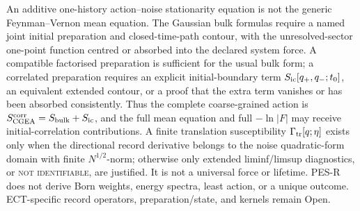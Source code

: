 \documentclass[11pt,a4paper]{article}
\begin{document}
An additive one-history action--noise stationarity equation is not the
generic Feynman--Vernon mean equation.  The Gaussian bulk formulas require a
named joint initial preparation and closed-time-path contour, with the
unresolved-sector one-point function centred or absorbed into the declared
system force.  A compatible factorised preparation is sufficient for the
usual bulk form; a correlated preparation requires an explicit
initial-boundary term $S_{\rm ic}[q_+,q_-;t_0]$, an equivalent extended
contour, or a proof that the extra term vanishes or has been absorbed
consistently.  Thus the complete coarse-grained action is
$S_{\rm CGEA}^{\rm corr}=S_{\rm bulk}+S_{\rm ic}$, and the full mean equation
and full $-\ln|F|$ may receive initial-correlation contributions.  A finite
translation susceptibility $\Gamma_{\rm tr}[q;\eta]$ exists only when the
directional record derivative belongs to the noise quadratic-form domain
with finite $N^{1/2}$-norm; otherwise only extended liminf/limsup diagnostics,
or \textsc{not identifiable}, are justified.  It is not a universal force
or lifetime.  PES-R does not derive Born weights, energy spectra, least
action, or a unique outcome.  ECT-specific record operators,
preparation/state, and kernels remain Open.
\end{document}
